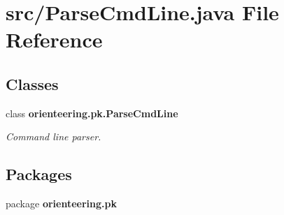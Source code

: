 \section{src/\+Parse\+Cmd\+Line.java File Reference}
\label{ParseCmdLine_8java}
\subsection*{Classes}
\begin{DoxyCompactItemize}
\item 
class {\bfseries orienteering.\+pk.\+Parse\+Cmd\+Line}
\begin{DoxyCompactList}\small\item\em Command line parser. \end{DoxyCompactList}\end{DoxyCompactItemize}
\subsection*{Packages}
\begin{DoxyCompactItemize}
\item 
package \textbf{ orienteering.\+pk}
\end{DoxyCompactItemize}
